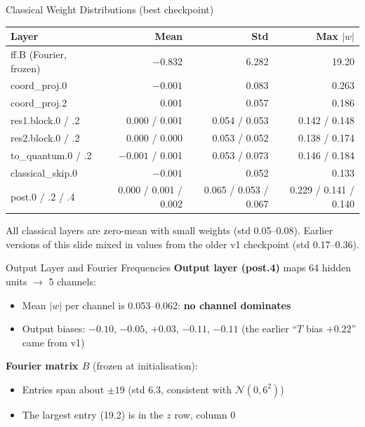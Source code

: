 \documentclass[aspectratio=169]{beamer}
\begin{document}
\begin{frame}{Classical Weight Distributions (best checkpoint)}
\begin{table}
\centering
\scriptsize
\begin{tabular}{lrrr}
\toprule
Layer & Mean & Std & Max $|w|$ \\
\midrule
ff.B (Fourier, frozen) & $-0.832$ & 6.282 & 19.20 \\
coord\_proj.0 & $-0.001$ & 0.083 & 0.263 \\
coord\_proj.2 & 0.001 & 0.057 & 0.186 \\
res1.block.0 / .2 & 0.000 / 0.001 & 0.054 / 0.053 & 0.142 / 0.148 \\
res2.block.0 / .2 & 0.000 / 0.000 & 0.053 / 0.052 & 0.138 / 0.174 \\
to\_quantum.0 / .2 & $-0.001$ / 0.001 & 0.053 / 0.073 & 0.146 / 0.184 \\
classical\_skip.0 & $-0.001$ & 0.052 & 0.133 \\
post.0 / .2 / .4 & 0.000 / 0.001 / 0.002 & 0.065 / 0.053 / 0.067 & 0.229 / 0.141 / 0.140 \\
\bottomrule
\end{tabular}
\end{table}
All classical layers are zero-mean with small weights (std 0.05--0.08). Earlier versions of this slide mixed in values from the older v1 checkpoint (std 0.17--0.36).
\end{frame}

\begin{frame}{Output Layer and Fourier Frequencies}
\textbf{Output layer (post.4)} maps 64 hidden units $\to$ 5 channels:
\begin{itemize}
  \item Mean $|w|$ per channel is 0.053--0.062: \textbf{no channel dominates}
  \item Output biases: $-0.10$, $-0.05$, $+0.03$, $-0.11$, $-0.11$ (the earlier ``$T$ bias $+0.22$'' came from v1)
\end{itemize}

\vspace{0.3cm}
\textbf{Fourier matrix $B$} (frozen at initialisation):
\begin{itemize}
  \item Entries span about $\pm19$ (std 6.3, consistent with $\mathcal{N}(0,6^2)$)
  \item The largest entry (19.2) is in the $z$ row, column 0
\end{itemize}
\end{frame}
\end{document}

